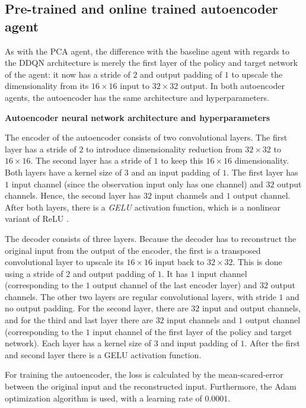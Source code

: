 \subsection{Pre-trained and online trained autoencoder agent} %
As with the PCA agent, the difference with the baseline agent with regards to the DDQN architecture is merely the first layer of the policy and target network of the agent: it now has a stride of $2$ and output padding of $1$ to upscale the dimensionality from its $16 \times 16$ input to $32 \times 32$ output. In both autoencoder agents, the autoencoder has the same architecture and hyperparameters. \par

\noindent \textbf{Autoencoder neural network architecture and hyperparameters} \par
\noindent The encoder of the autoencoder consists of two convolutional layers. The first layer has a stride of $2$ to introduce dimensionality reduction from $32 \times 32$ to $16 \times 16$. The second layer has a stride of $1$ to keep this $16 \times 16$ dimensionality. Both layers have a kernel size of $3$ and an input padding of $1$. The first layer has $1$ input channel (since the observation input only has one channel) and $32$ output channels. Hence, the second layer has $32$ input channels and $1$ output channel. After both layers, there is a \emph{GELU} activation function, which is a nonlinear variant of ReLU \cite{gelu}.

The decoder consists of three layers. Because the decoder has to reconstruct the original input from the output of the encoder, the first is a transposed convolutional layer to upscale its $16 \times 16$ input back to $32 \times 32$. This is done using a stride of $2$ and output padding of $1$. It has $1$ input channel (corresponding to the $1$ output channel of the last encoder layer) and $32$ output channels. The other two layers are regular convolutional layers, with stride $1$ and no output padding. For the second layer, there are $32$ input and output channels, and for the third and last layer there are $32$ input channels and $1$ output channel (corresponding to the $1$ input channel of the first layer of the policy and target network). Each layer has a kernel size of $3$ and input padding of $1$. After the first and second layer there is a GELU activation function.

For training the autoencoder, the loss is calculated by the mean-scared-error between the original input and the reconstructed input. Furthermore, the Adam optimization algorithm is used, with a learning rate of $0.0001$. 


